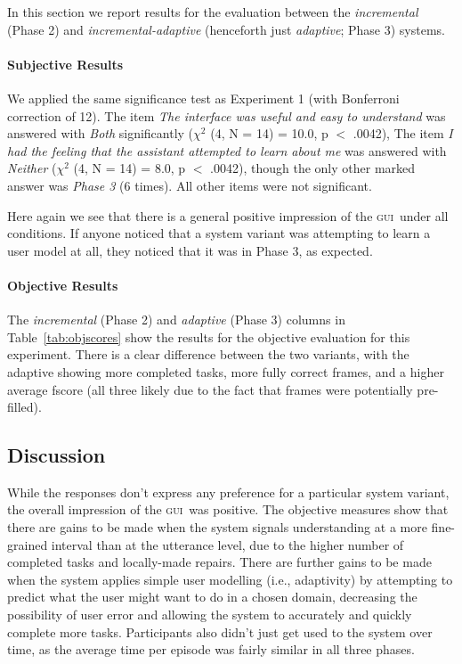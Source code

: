 \documentclass[11pt]{article}
\newcommand{\ui}[0]{\textsc{gui}}
\begin{document}
In this section we report results for the evaluation between the \emph{incremental} (Phase 2) and \emph{incremental-adaptive} (henceforth just \emph{adaptive}; Phase 3) systems. 

\paragraph{Subjective Results}  We applied the same significance test as Experiment 1 (with Bonferroni correction of 12). The item \emph{The interface was useful and easy to understand} was answered with \emph{Both} significantly  ($ \chi^2 $ (4, N = 14) = 10.0, p $<$ .0042), The item \emph{I had the feeling that the assistant attempted to learn about me} was answered with \emph{Neither} ($ \chi^2 $ (4, N = 14) = 8.0, p $<$ .0042), though the only other marked answer was \emph{Phase 3} (6 times). All other items were not significant.

Here again we see that there is a general positive impression of the \ui\ under all conditions. If anyone noticed that a system variant was attempting to learn a user model at all, they noticed that it was in Phase 3, as expected. 

\paragraph{Objective Results} The \emph{incremental} (Phase 2) and \emph{adaptive} (Phase 3) columns in Table~\ref{tab:objscores} show the results for the objective evaluation for this experiment. There is a clear difference between the two variants, with the adaptive showing more completed tasks, more fully correct frames, and a higher average fscore (all three likely due to the fact that frames were potentially pre-filled). 

\subsection{Discussion}

While the responses don't express any preference for a particular system variant, the overall impression of the \ui\ was positive. The objective measures show that there are gains to be made when the system signals understanding at a more fine-grained interval than at the utterance level, due to the higher number of completed tasks and locally-made repairs. There are further gains to be made when the system applies simple user modelling (i.e., adaptivity) by attempting to predict what the user might want to do in a chosen domain, decreasing the possibility of user error and allowing the system to accurately and quickly complete more tasks. Participants also didn't just get used to the system over time, as the average time per episode was fairly similar in all three phases. 
\end{document}
